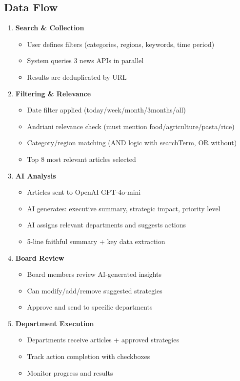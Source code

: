 \documentclass[11pt,a4paper]{article}
\begin{document}
\subsection{Data Flow}

\begin{enumerate}[leftmargin=*]
    \item \textbf{Search \& Collection}
    \begin{itemize}
        \item User defines filters (categories, regions, keywords, time period)
        \item System queries 3 news APIs in parallel
        \item Results are deduplicated by URL
    \end{itemize}
    
    \item \textbf{Filtering \& Relevance}
    \begin{itemize}
        \item Date filter applied (today/week/month/3months/all)
        \item Andriani relevance check (must mention food/agriculture/pasta/rice)
        \item Category/region matching (AND logic with searchTerm, OR without)
        \item Top 8 most relevant articles selected
    \end{itemize}
    
    \item \textbf{AI Analysis}
    \begin{itemize}
        \item Articles sent to OpenAI GPT-4o-mini
        \item AI generates: executive summary, strategic impact, priority level
        \item AI assigns relevant departments and suggests actions
        \item 5-line faithful summary + key data extraction
    \end{itemize}
    
    \item \textbf{Board Review}
    \begin{itemize}
        \item Board members review AI-generated insights
        \item Can modify/add/remove suggested strategies
        \item Approve and send to specific departments
    \end{itemize}
    
    \item \textbf{Department Execution}
    \begin{itemize}
        \item Departments receive articles + approved strategies
        \item Track action completion with checkboxes
        \item Monitor progress and results
    \end{itemize}
\end{enumerate}
\end{document}
